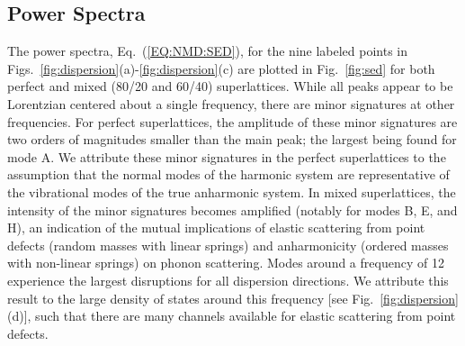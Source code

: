 \documentclass[aps,prb,preprint,preprintnumbers,amsmath,amssymb,floatfix,superscriptaddress]{revtex4}
\begin{document}
\subsection{Power Spectra}

The power spectra, Eq.~(\ref{EQ:NMD:SED}), for the nine labeled points in Figs.~\ref{fig:dispersion}(a)-\ref{fig:dispersion}(c) are plotted in Fig.~\ref{fig:sed} for both perfect and mixed (80/20 and 60/40) superlattices. While all peaks appear to be Lorentzian centered about a single frequency, there are minor signatures at other frequencies. For perfect superlattices, the amplitude of these minor signatures are two orders of magnitudes smaller than the main peak; the largest being found for mode A. We attribute these minor signatures in the perfect superlattices to the assumption that the normal modes of the harmonic system are representative of the vibrational modes of the true anharmonic system. In mixed superlattices, the intensity of the minor signatures becomes amplified (notably for modes B, E, and H), an indication of the mutual implications of elastic scattering from point defects (random masses with linear springs) and anharmonicity (ordered masses with non-linear springs) on phonon scattering. \cite{RevModPhys.53.175}  Modes around a frequency of 12 experience the largest disruptions for all dispersion directions. We attribute this result to the large density of states around this frequency [see Fig.~\ref{fig:dispersion}(d)], such that there are many channels available for elastic scattering from point defects.\cite{tamura_isotope_1983} 
\end{document}
